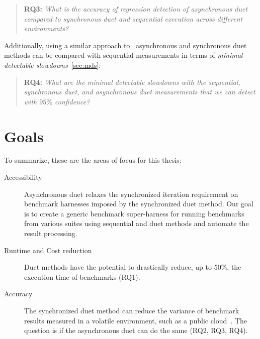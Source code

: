 \begin{quote}
	\textbf{RQ3:} \emph{What is the accuracy of regression detection of asynchronous duet compared to synchronous duet and sequential execution across different environments?}
\end{quote}

Additionally, using a similar approach to~\citet{laaber2019software} asynchronous and synchronous duet methods can be compared with sequential measurements in terms of \emph{minimal detectable slowdowns}~\cref{sec:mds}:

\begin{quote}
	\textbf{RQ4:} \emph{What are the minimal detectable slowdowns with the sequential, synchronous duet, and asynchronous duet measurements that we can detect with $95\%$ confidence?}
\end{quote}

\section{Goals}
\label{sec:goals}

To summarize, these are the areas of focus for this thesis:
\begin{description}
	\item[Accessibility]
		Asynchronous duet relaxes the synchronized iteration requirement on benchmark harnesses imposed by the synchronized duet method.
		Our goal is to create a generic benchmark super-harness for running benchmarks from various suites using sequential and duet methods and automate the result processing.
	\item[Runtime and Cost reduction]
		Duet methods have the potential to drastically reduce, up to $50\%$, the execution time of benchmarks (RQ1).
	\item[Accuracy]
		The synchronized duet method can reduce the variance of benchmark results measured in a volatile environment, such as a public cloud~\cite{bulej2020duet}.
		The question is if the asynchronous duet can do the same (RQ2, RQ3, RQ4).
\end{description}
